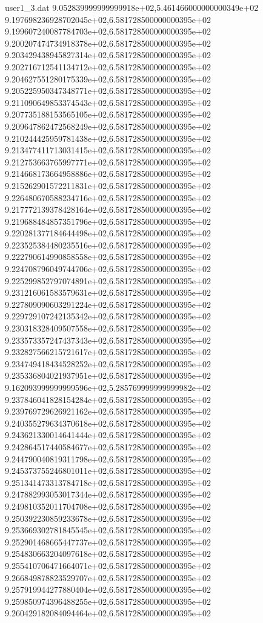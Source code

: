 \begin{filecontents}{user1_3.dat}
9.052839999999999918e+02,5.461466000000000349e+02
9.197698236928702045e+02,6.581728500000000395e+02
9.199607240087784703e+02,6.581728500000000395e+02
9.200207474734918378e+02,6.581728500000000395e+02
9.203429438945827314e+02,6.581728500000000395e+02
9.202716712541134712e+02,6.581728500000000395e+02
9.204627551280175339e+02,6.581728500000000395e+02
9.205225950347348771e+02,6.581728500000000395e+02
9.211090649853374543e+02,6.581728500000000395e+02
9.207735188153565105e+02,6.581728500000000395e+02
9.209647862472568249e+02,6.581728500000000395e+02
9.210244425959781438e+02,6.581728500000000395e+02
9.213477411713031415e+02,6.581728500000000395e+02
9.212753663765997771e+02,6.581728500000000395e+02
9.214668173664958886e+02,6.581728500000000395e+02
9.215262901572211831e+02,6.581728500000000395e+02
9.226480670588234716e+02,6.581728500000000395e+02
9.217772139378428164e+02,6.581728500000000395e+02
9.219688484857351796e+02,6.581728500000000395e+02
9.220281377184644498e+02,6.581728500000000395e+02
9.223525384480235516e+02,6.581728500000000395e+02
9.222790614990858558e+02,6.581728500000000395e+02
9.224708796049744706e+02,6.581728500000000395e+02
9.225299852797074891e+02,6.581728500000000395e+02
9.231216061583579631e+02,6.581728500000000395e+02
9.227809090603291224e+02,6.581728500000000395e+02
9.229729107242135342e+02,6.581728500000000395e+02
9.230318328409507558e+02,6.581728500000000395e+02
9.233573357247437343e+02,6.581728500000000395e+02
9.232827566215721617e+02,6.581728500000000395e+02
9.234749418434528252e+02,6.581728500000000395e+02
9.235336804021937951e+02,6.581728500000000395e+02
9.162093999999999596e+02,5.285769999999999982e+02
9.237846041828154284e+02,6.581728500000000395e+02
9.239769729626921162e+02,6.581728500000000395e+02
9.240355279634370618e+02,6.581728500000000395e+02
9.243621330014641444e+02,6.581728500000000395e+02
9.242864517440584677e+02,6.581728500000000395e+02
9.244790040819311798e+02,6.581728500000000395e+02
9.245373755246801011e+02,6.581728500000000395e+02
9.251341473313784718e+02,6.581728500000000395e+02
9.247882993053017344e+02,6.581728500000000395e+02
9.249810352011704708e+02,6.581728500000000395e+02
9.250392230859233678e+02,6.581728500000000395e+02
9.253669302781845545e+02,6.581728500000000395e+02
9.252901468665447737e+02,6.581728500000000395e+02
9.254830663204097618e+02,6.581728500000000395e+02
9.255410706471664071e+02,6.581728500000000395e+02
9.266849878823529707e+02,6.581728500000000395e+02
9.257919944277880404e+02,6.581728500000000395e+02
9.259850974396488255e+02,6.581728500000000395e+02
9.260429182084094464e+02,6.581728500000000395e+02

\end{filecontents}
